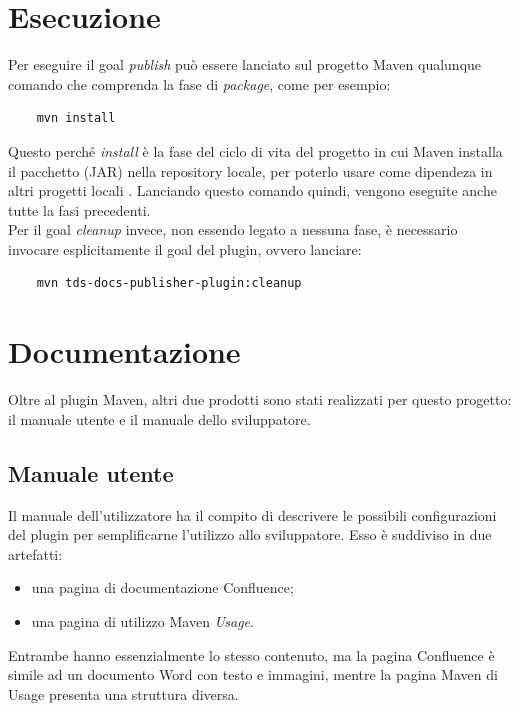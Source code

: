 \clearpage

\section{Esecuzione}    \label{secEsecuzione}
Per eseguire il goal \emph{publish} può essere lanciato sul progetto Maven qualunque comando che comprenda la fase di \emph{package}, come per esempio:
\begin{lstlisting} 
    mvn install
\end{lstlisting}
Questo perché \emph{install} è la fase del ciclo di vita del progetto in cui Maven installa il pacchetto (JAR) nella repository locale, per poterlo usare come dipendeza in altri progetti locali \cite{site:maven-lifecycle}.
Lanciando questo comando quindi, vengono eseguite anche tutte la fasi precedenti.\\

Per il goal \emph{cleanup} invece, non essendo legato a nessuna fase, è necessario invocare esplicitamente il goal del plugin, ovvero lanciare:
\begin{lstlisting} 
    mvn tds-docs-publisher-plugin:cleanup
\end{lstlisting}


\section{Documentazione}    \label{secDocumentazione}
Oltre al plugin Maven, altri due prodotti sono stati realizzati per questo progetto: il manuale utente e il manuale dello sviluppatore.

    \subsection{Manuale utente}
    Il manuale dell'utilizzatore ha il compito di descrivere le possibili configurazioni del plugin per semplificarne l'utilizzo allo sviluppatore.
    Esso è suddiviso in due artefatti:
    \begin{itemize}
        \item una pagina di documentazione Confluence;
        \item una pagina di utilizzo Maven \emph{Usage}.
    \end{itemize}
    Entrambe hanno essenzialmente lo stesso contenuto, ma la pagina Confluence è simile ad un documento Word con testo e immagini, mentre la pagina Maven di Usage presenta una struttura diversa.

